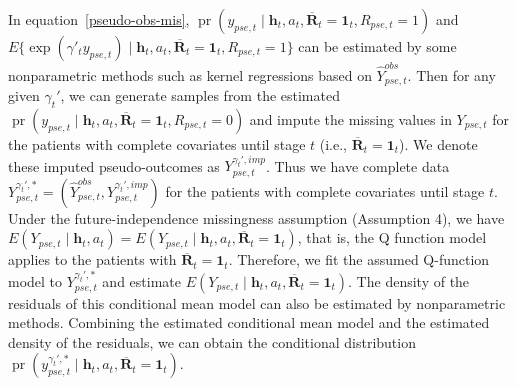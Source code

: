 \documentclass[12pt]{article}
\DeclareMathOperator{\pr}{pr}
\begin{document}
In equation~\eqref{pseudo-obs-mis}, $\pr(y_{pse,t}\mid \bm{h}_t,a_t,\overline{\bm{R}}_t = \bm{1}_t,R_{pse,t}=1)$ and $E\{\exp(\gamma'_t y_{pse,t}) \mid \bm{h}_t,a_t,\overline{\bm{R}}_t = \bm{1}_t, R_{pse,t}=1\}$ can be estimated by some nonparametric methods such as kernel regressions based on $\widehat{Y}_{pse,t}^{obs}$. 
Then for any given $\gamma_t'$, we can generate samples from  the estimated $\pr(y_{pse,t}\mid \bm{h}_t,a_t,\overline{\bm{R}}_t = \bm{1}_t,R_{pse,t}=0)$   and impute the missing values in $Y_{pse,t}$ for the patients with complete covariates until stage $t$ (i.e., $\overline{\bm{R}}_t=\bm{1}_t$). We denote these imputed  pseudo-outcomes as $Y_{pse,t}^{\gamma_t',imp}$.
Thus we have complete data ${Y}_{pse,t}^{\gamma_t',*} = (\widehat{Y}_{pse,t}^{obs}, Y_{pse,t}^{\gamma_t',imp})$ for the patients with complete covariates until stage $t$.
Under the future-independence missingness assumption (Assumption 4), we have $E(Y_{pse,t}\mid \bm{h}_t,a_t) = E(Y_{pse,t}\mid \bm{h}_t,a_t,\overline{\bm{R}}_t=\bm{1}_t)$, that is, the Q function model applies to the patients with $\overline{\bm{R}}_t=\bm{1}_t$.  Therefore, we  fit   the assumed Q-function model to ${Y}_{pse,t}^{\gamma_t',*}$ and   estimate $E(Y_{pse,t}\mid \bm{h}_t,a_t,\overline{\bm{R}}_t=\bm{1}_t)$.
The density of the residuals of  this conditional mean  model can also be estimated by nonparametric methods. Combining the estimated conditional mean model and the estimated density of the residuals,  we can obtain the conditional distribution $\pr(y_{pse,t}^{\gamma_t',*}\mid \bm{h}_t,a_t,\overline{\bm{R}}_t=\bm{1}_t)$.  
\end{document}
